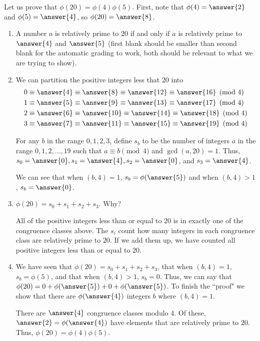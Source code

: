\documentclass{ximera}
\begin{document}
\begin{question}
Let us prove that $\phi(20)=\phi(4)\phi(5)$. First, note that $\phi(4)=\answer{2}$ and $\phi(5)=\answer{4}$, so $\phi(20)=\answer{8}$.
\begin{enumerate}
 \item A number $a$ is relatively prime to $20$ if and only if $a$ is relatively prime to $\answer{4}$ and $\answer{5}$ (first blank should be smaller than second blank for the automatic grading to work, both should be relevant to what we are trying to show). 
 \item  
 We can partition the positive integers less that $20$ into 
 \begin{align*}
& 0\equiv\answer{4}\equiv\answer{8}\equiv\answer{12}\equiv\answer{16}\pmod 4\\
& 1\equiv\answer{5}\equiv\answer{9}\equiv\answer{13}\equiv\answer{17}\pmod 4\\
& 2\equiv\answer{6}\equiv\answer{10}\equiv\answer{14}\equiv\answer{18}\pmod 4\\
& 3\equiv\answer{7}\equiv\answer{11}\equiv\answer{15}\equiv\answer{19}\pmod 4
\end{align*}

For any $b$ in the range $0,1,2,3$, define $s_b$ to be the number of integers $a$ in the range $0,1,2,\dots, 19$ such that $a\equiv b \pmod 4$ and $\gcd(a,20)=1$. Thus, $s_0=\answer{0}, s_1=\answer{4}, s_2=\answer{0}$, and $s_3=\answer{4}$.

We can see that when $(b,4)=1$, $s_b=\phi(\answer{5})$ and when $(b,4)>1$, $s_b=\answer{0}$.

\item $\phi(20)=s_0+s_1+s_2+s_3$. Why? 

All of the positive integers less than or equal to $20$ is in exactly one of the congruence classes above. The $s_i$ count how many integers in each congruence class are relatively prime to $20$. If we add them up, we have counted all positive integers less than or equal to $20$.

\item We have seen that $\phi(20)=s_0+s_1+s_2+s_3$, that when $(b,4)=1$, $s_b=\phi(5)$, and that when $(b,4)>1$, $s_b=0$. Thus, we can say that $\phi(20)=0+\phi(\answer{5})+0+\phi(\answer{5})$. To finish the 	``proof" we show that there are $\phi(\answer{4})$ integers $b$ where $(b,4)=1$. 

There are $\answer{4}$ congruence classes modulo 4. Of these, $\answer{2}=\phi(\answer{4})$ have elements that are relatively prime to $20$. Thus, $\phi(20)=\phi(4)\phi(5)$.
\end{enumerate}

\end{question}
\end{document}
